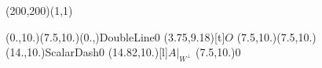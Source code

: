 \unitlength=1bp%

\begin{feynartspicture}(200,200)(1,1)

\FADiagram{}
\FAProp(0.,10.)(7.5,10.)(0.,){DoubleLine}{0}
\FALabel(3.75,9.18)[t]{$O$}
\FAProp(7.5,10.)(7.5,10.)(14.,10.){ScalarDash}{0}
\FALabel(14.82,10.)[l]{$A|_{W^\perp}$}
\FAVert(7.5,10.){0}
\end{feynartspicture}

